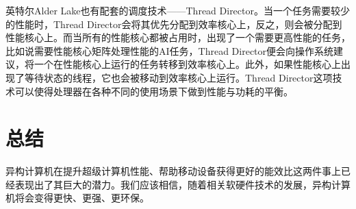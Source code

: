 \documentclass[UTF8,a4paper,10pt]{ctexart}
\begin{document}
英特尔Alder Lake也有配套的调度技术——Thread Director。当一个任务需要较少的性能时，Thread Director会将其优先分配到效率核心上，反之，则会被分配到性能核心上。而当所有的性能核心都被占用时，出现了一个需要更高性能的任务，比如说需要性能核心矩阵处理性能的AI任务，Thread Director便会向操作系统建议，将一个在性能核心上运行的任务转移到效率核心上。此外，如果性能核心上出现了等待状态的线程，它也会被移动到效率核心上运行。Thread Director这项技术可以使得处理器在各种不同的使用场景下做到性能与功耗的平衡。\cite{intel_alder_lake}


\section{总结}
异构计算机在提升超级计算机性能、帮助移动设备获得更好的能效比这两件事上已经表现出了其巨大的潜力。我们应该相信，随着相关软硬件技术的发展，异构计算机将会变得更快、更强、更环保。
\newpage

 
\end{document}
